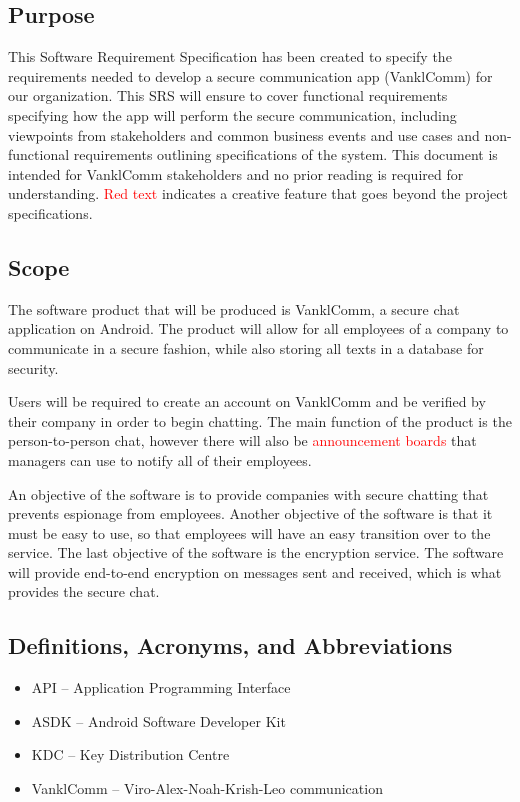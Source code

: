 \documentclass[]{article}
\begin{document}
\subsection{Purpose}
\label{sub:purpose}
This Software Requirement Specification has been created to specify the requirements needed to develop a secure communication app (VanklComm) for our organization. This SRS will ensure to cover functional requirements specifying how the app will perform the secure communication, including viewpoints from stakeholders and common business events and use cases and non-functional requirements outlining specifications of the system. This document is intended for VanklComm stakeholders and no prior reading is required for understanding. \newline
\textcolor{red}{Red text} indicates a creative feature that goes beyond the project specifications.

\subsection{Scope}
\label{sub:scope}
\par The software product that will be produced is VanklComm, a secure chat application on Android. The product will allow for all employees of a company to communicate in a secure fashion, while also storing all texts in a database for security.
\\
\par \noindent Users will be required to create an account on VanklComm and be verified by their company in order to begin chatting. The main function of the product is the person-to-person chat, however there will also be \textcolor{red}{announcement boards} that managers can use to notify all of their employees.
\\
\par \noindent An objective of the software is to provide companies with secure chatting that prevents espionage from employees. Another objective of the software is that it must be easy to use, so that employees will have an easy transition over to the service. The last objective of the software is the encryption service. The software will provide end-to-end encryption on messages sent and received, which is what provides the secure chat.


\subsection{Definitions, Acronyms, and Abbreviations}
\label{sub:definitions_acronyms_and_abbreviations}
\begin{itemize}
	\item API – Application Programming Interface
	\item ASDK – Android Software Developer Kit
	\item KDC – Key Distribution Centre
	\item VanklComm – Viro-Alex-Noah-Krish-Leo communication

\end{itemize}
\end{document}
